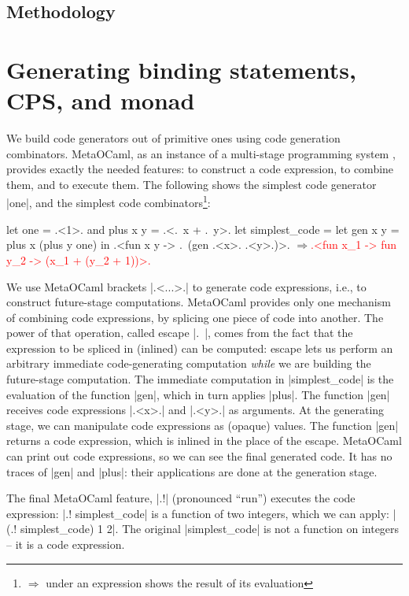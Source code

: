 \documentclass[draft]{elsart}
\newcommand{\evalresult}[1]{\ensuremath{\Longrightarrow}\textcolor{red}{#1}}
\begin{document}
\subsection{Methodology}

\section{Generating binding statements, CPS, and monad}\label{CPS}

We build code generators out of primitive ones using code generation 
combinators. MetaOCaml, as an instance of a multi-stage
programming system \cite{TahaThesis}, provides exactly the needed
features: to construct a code expression, to combine them, and to
execute them. The following shows the simplest code generator |one|,
and the simplest code combinators\footnote{%
$\Longrightarrow$ under an expression shows the result of its evaluation}:

\begin{code}
let one = .<1>. and plus x y = .<.~x + .~y>.
let simplest_code = let gen x y = plus x (plus y one) in
  .<fun x y -> .~(gen .<x>. .<y>.)>.
\evalresult{.<fun x_1 -> fun y_2 -> (x_1 + (y_2 + 1))>.}
\end{code}

We use MetaOCaml brackets |.<...>.| to generate code expressions,
i.e., to construct future-stage computations. MetaOCaml provides only
one mechanism of combining code expressions, by splicing one
piece of code into
another. The power of that operation, called escape |.~|, comes from
the fact that the expression to be spliced in (inlined) can be
computed: escape lets us perform an arbitrary immediate code-generating
computation \emph{while} we are
building the future-stage computation. The immediate computation in
|simplest_code| is the evaluation of the function |gen|, which in turn
applies |plus|. The function |gen| receives code expressions |.<x>.|
and |.<y>.| as arguments. At the generating stage, we can manipulate
code expressions as (opaque) values. The function |gen| returns a code
expression, which is inlined in the place of the escape. MetaOCaml can
print out code expressions, so we can see the final generated code. It
has no traces of |gen| and |plus|: their applications are done at the
generation stage.

The final MetaOCaml feature, |.!| (pronounced ``run'') 
executes the code expression: |.! simplest_code| is a function of two
integers, which we can apply: |(.! simplest_code) 1 2|. The original
|simplest_code| is not a function on integers -- it is a code
expression.
\end{document}
